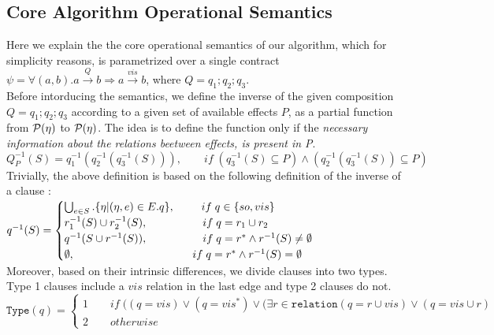 \subsection{Core Algorithm Operational Semantics}
Here we explain the the core operational semantics of our algorithm, which for simplicity reasons, 
is parametrized over a single contract 
$\psi = \forall (a,b). a \xrightarrow{Q} b  \Rightarrow a \xrightarrow{vis} b$, where $Q=q_1;q_2;q_3$. 
\\Before intorducing the semantics, we define the inverse of the given composition $Q=q_1;q_2;q_3$ according to a given
set of available effects $P$, as a partial function from $\mathcal{P}(\eta)$ to
$\mathcal{P}(\eta)$. The idea is to define the function only if the \emph{necessary information about the relations beetween effects, is present in P}.
\\ $
Q^{-1}_P (S)= q_1^{-1} (q_2^{-1}(q_3^{-1}(S))), \qquad 
if \; (q_3^{-1}(S) \subseteq P)\wedge
(q_2^{-1}(q_3^{-1}(S))  \subseteq P)$
\\Trivially, the above definition is based on the following definition of
the inverse of a clause :\\
$q^{-1}(S) = 
\begin{cases}
\bigcup^{}_{e\in S}. \{\eta|(\eta,e) \in E.q \}, \hspace{8.5 mm} if \;
q\in\{so,vis\} \\ 
r_1^{-1}(S)\cup r_2^{-1}(S), \qquad \spc \qquad if \; q=r_1\cup r_2\\
q^{-1}(S\cup r^{-1}(S)), \qquad \quad \qquad if \; q=r^* \wedge r^{-1}(S) \neq \emptyset \\
\emptyset, \qquad \quad \hspace{20 mm} \qquad if \; q=r^* \wedge r^{-1}(S) = \emptyset
\end{cases}
$
\\ Moreover, based on their intrinsic differences, we divide clauses into two types. 
Type 1 clauses include a $vis$ relation in the last edge and type 2 clauses do not. 
\\$
\mathtt{Type}(q) = 
\begin{cases}
1 \qquad if \; ((q=vis) \vee (q=vis^*) \vee (\exists r\in
\mathtt{relation}(q=r\cup vis) \vee (q=vis\cup r) \\ 
2 \qquad otherwise
\end{cases}
$



